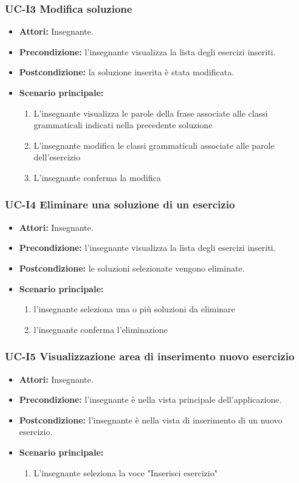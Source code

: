\subsubsection{UC-I3 Modifica soluzione}
\begin{itemize}
	\item \textbf{Attori:} Insegnante.
	\item \textbf{Precondizione:} l'insegnante visualizza la lista degli esercizi inseriti.
	\item \textbf{Postcondizione:} la soluzione inserita è stata modificata.
	\item \textbf{Scenario principale:}
		\begin{enumerate}
		\item L'insegnante visualizza le parole della frase associate alle classi grammaticali indicati nella precedente soluzione
		\item L'insegnante modifica le classi grammaticali associate alle parole dell'esercizio
		\item L'insegnante conferma la modifica
		\end{enumerate}
\end{itemize}
	
\subsubsection{UC-I4 Eliminare una soluzione di un esercizio}
\begin{itemize}
	\item \textbf{Attori:} Insegnante.
	\item \textbf{Precondizione:} l'insegnante visualizza la lista degli esercizi inseriti.
	\item \textbf{Postcondizione:} le soluzioni selezionate vengono eliminate.
	\item \textbf{Scenario principale:}
		\begin{enumerate}
			\item l'insegnante seleziona una o più soluzioni da eliminare
			\item l'insegnante conferma l'eliminazione
		\end{enumerate}
\end{itemize}

\subsubsection{UC-I5 Visualizzazione area di inserimento nuovo esercizio}
\begin{itemize}
		\item \textbf{Attori: }Insegnante.
		\item \textbf{Precondizione: }l'insegnante è nella vista principale dell'applicazione.
		\item \textbf{Postcondizione: }l'insegnante è nella vista di inserimento di un nuovo esercizio.
		\item \textbf{Scenario principale: }
	\begin{enumerate} 
		\item L'insegnante seleziona la voce "Inserisci esercizio"
	\end{enumerate}
\end{itemize}

